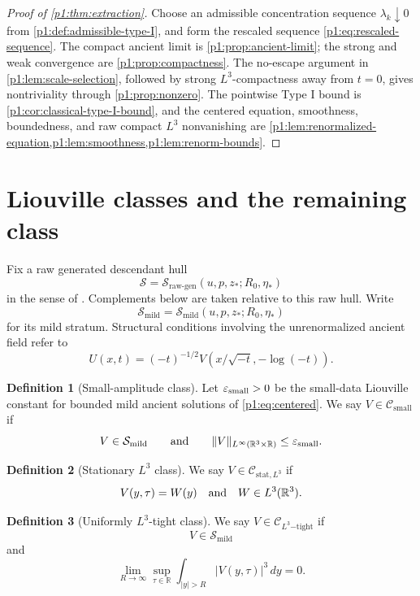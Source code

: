 \documentclass[11pt]{amsart}
\theoremstyle{plain}
\theoremstyle{definition}
\newtheorem{definition}[definition]{Definition}
\theoremstyle{remark}
\numberwithin{equation}{section}
\newcommand{\R}{\mathbb R}
\newcommand{\calS}{\mathcal S}
\newcommand{\calC}{\mathcal C}
\begin{document}
\begin{proof}[Proof of \cref{p1:thm:extraction}]
Choose an admissible concentration sequence
\(\lambda_k\downarrow0\) from \cref{p1:def:admissible-type-I}, and form the
rescaled sequence \eqref{p1:eq:rescaled-sequence}.  The compact ancient limit is
\cref{p1:prop:ancient-limit}; the strong and weak convergence are
\cref{p1:prop:compactness}.  The no-escape argument in
\cref{p1:lem:scale-selection}, followed by strong \(L^3\)-compactness away from
\(t=0\), gives nontriviality through \cref{p1:prop:nonzero}.  The pointwise
Type I bound is \cref{p1:cor:classical-type-I-bound}, and the centered equation,
smoothness, boundedness, and raw compact \(L^3\) nonvanishing are
\cref{p1:lem:renormalized-equation,p1:lem:smoothness,p1:lem:renorm-bounds}.
\end{proof}

\section{Liouville classes and the remaining class}\label{p1:sec:classes}

Fix a raw generated descendant hull
\[
   \calS=\calS_{\mathrm{raw\text{-}gen}}(u,p,z_*;R_0,\eta_*)
\]
in the sense of .  Complements below
are taken relative to this raw hull.  Write
\[
   \calS_{\mathrm{mild}}
   =
   \calS_{\mathrm{mild}}(u,p,z_*;R_0,\eta_*)
\]
for its mild stratum.  Structural conditions involving the unrenormalized
ancient field refer to
\[
   U(x,t)=(-t)^{-1/2}V(x/\sqrt{-t},-\log(-t)).
\]

\begin{definition}[Small-amplitude class]\label{p1:def:small-class}
Let \(\varepsilon_{\rm small}>0\) be the small-data Liouville constant for
bounded mild ancient solutions of \eqref{p1:eq:centered}.  We say
\(V\in\calC_{\mathrm{small}}\) if
\[
   V\in\calS_{\mathrm{mild}}
   \qquad\text{and}\qquad
   \|V\|_{L^\infty(\R^3\times\R)}\le \varepsilon_{\rm small}.
\]
\end{definition}

\begin{definition}[Stationary \(L^3\) class]\label{p1:def:stationary-class}
We say \(V\in\calC_{\mathrm{stat},L^3}\) if
\[
   V(y,\tau)=W(y)
   \quad\hbox{and}\quad
   W\in L^3(\R^3).
\]
\end{definition}

\begin{definition}[Uniformly \(L^3\)-tight class]\label{p1:def:tight-class}
We say \(V\in\calC_{L^3\mathrm{-tight}}\) if
\[
   V\in\calS_{\mathrm{mild}}
\]
and
\begin{equation}\label{p1:eq:L3-tightness}
   \lim_{R\to\infty}
   \sup_{\tau\in\R}\int_{|y|>R}|V(y,\tau)|^3\,dy=0 .
\end{equation}
\end{definition}
\end{document}
